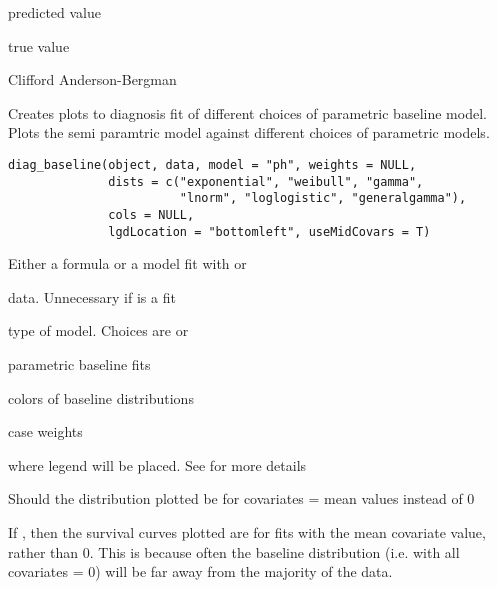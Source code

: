 \documentclass[a4paper]{book}
\begin{document}
%
\begin{Arguments}
\begin{ldescription}
\item[\code{pred}] predicted value
\item[\code{t\_val}] true value
\end{ldescription}
\end{Arguments}
%
\begin{Author}\relax
Clifford Anderson-Bergman
\end{Author}
%
\begin{Description}\relax
Creates plots to diagnosis fit of different choices of parametric baseline model. Plots the semi paramtric model against different choices of parametric models. 

\end{Description}
%
\begin{Usage}
\begin{verbatim}
diag_baseline(object, data, model = "ph", weights = NULL,
              dists = c("exponential", "weibull", "gamma", 
                        "lnorm", "loglogistic", "generalgamma"),
              cols = NULL, 
              lgdLocation = "bottomleft", useMidCovars = T)
\end{verbatim}
\end{Usage}
%
\begin{Arguments}
\begin{ldescription}
\item[\code{object}] Either a formula or a model fit with  or 
\item[\code{data}] data. Unnecessary if  is a fit
\item[\code{model}] type of model. Choices are  or 
\item[\code{dists}] parametric baseline fits	
\item[\code{cols}] colors of baseline distributions
\item[\code{weights}] case weights
\item[\code{lgdLocation}] where legend will be placed. See  for more details
\item[\code{useMidCovars}] Should the distribution plotted be for covariates = mean values instead of 0
\end{ldescription}
\end{Arguments}
%
\begin{Details}\relax
If , then the survival curves plotted are for fits with the mean covariate value, rather than 0. This is because often the baseline distribution (i.e. with all covariates = 0) will be far away from the majority of the data.

\end{Details}
\end{document}
